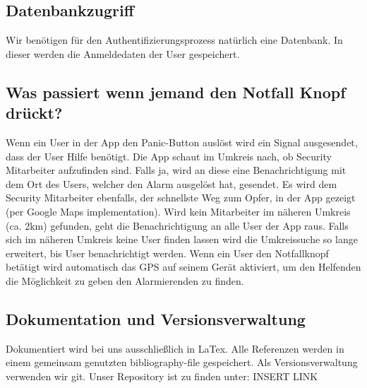 \documentclass{article}
\begin{document}
\subsection{Datenbankzugriff}
Wir benötigen für den Authentifizierungsprozess natürlich eine Datenbank. In dieser werden die Anmeldedaten der User gespeichert.
\subsection{Was passiert wenn jemand den Notfall Knopf drückt?}
Wenn ein User in der App den Panic-Button auslöst wird ein Signal ausgesendet, dass der User Hilfe benötigt. 
Die App schaut im Umkreis nach, ob Security Mitarbeiter aufzufinden sind. 
Falls ja, wird an diese eine Benachrichtigung mit dem Ort des Users, welcher den Alarm ausgelöst hat, gesendet. 
Es wird dem Security Mitarbeiter ebenfalls, der schnellste Weg zum Opfer, in der App gezeigt (per Google Maps implementation). 
Wird kein Mitarbeiter im näheren Umkreis (ca. 2km) gefunden, geht die Benachrichtigung an alle User der App raus. Falls sich im näheren Umkreis keine User finden lassen wird die Umkreissuche so lange erweitert, bis User benachrichtigt werden. 
Wenn ein User den Notfallknopf betätigt wird automatisch das GPS auf seinem Gerät aktiviert, um den Helfenden die Möglichkeit zu geben den Alarmierenden zu finden.
\subsection{Dokumentation und Versionsverwaltung}
Dokumentiert wird bei uns ausschließlich in LaTex. 
Alle Referenzen werden in einem gemeinsam genutzten bibliography-file gespeichert.
Als Versionsverwaltung verwenden wir git. Unser Repository ist zu finden unter: INSERT LINK
\end{document}
